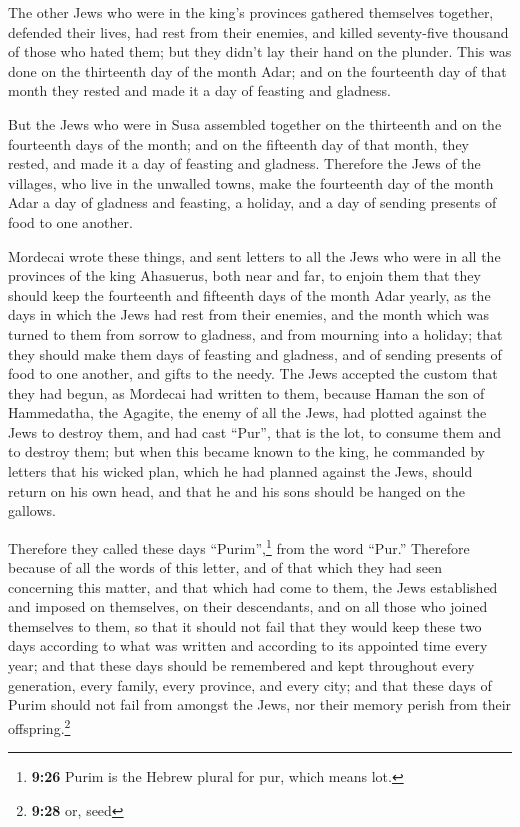  The other Jews who were in the king's provinces gathered
themselves together, defended their lives, had rest from their enemies,
and killed seventy-five thousand of those who hated them; but they
didn't lay their hand on the plunder.  This was done on
the thirteenth day of the month Adar; and on the fourteenth day of that
month they rested and made it a day of feasting and gladness.

 But the Jews who were in Susa assembled together on the
thirteenth and on the fourteenth days of the month; and on the fifteenth
day of that month, they rested, and made it a day of feasting and
gladness.  Therefore the Jews of the villages, who live
in the unwalled towns, make the fourteenth day of the month Adar a day
of gladness and feasting, a holiday, and a day of sending presents of
food to one another.

 Mordecai wrote these things, and sent letters to all the
Jews who were in all the provinces of the king Ahasuerus, both near and
far,  to enjoin them that they should keep the fourteenth
and fifteenth days of the month Adar yearly,  as the days
in which the Jews had rest from their enemies, and the month which was
turned to them from sorrow to gladness, and from mourning into a
holiday; that they should make them days of feasting and gladness, and
of sending presents of food to one another, and gifts to the needy.
 The Jews accepted the custom that they had begun, as
Mordecai had written to them,  because Haman the son of
Hammedatha, the Agagite, the enemy of all the Jews, had plotted against
the Jews to destroy them, and had cast ``Pur'', that is the lot, to
consume them and to destroy them;  but when this became
known to the king, he commanded by letters that his wicked plan, which
he had planned against the Jews, should return on his own head, and that
he and his sons should be hanged on the gallows.

 Therefore they called these days ``Purim'',\footnote{\textbf{9:26}
  Purim is the Hebrew plural for pur, which means lot.} from the word
``Pur.'' Therefore because of all the words of this letter, and of that
which they had seen concerning this matter, and that which had come to
them,  the Jews established and imposed on themselves, on
their descendants, and on all those who joined themselves to them, so
that it should not fail that they would keep these two days according to
what was written and according to its appointed time every year;
 and that these days should be remembered and kept
throughout every generation, every family, every province, and every
city; and that these days of Purim should not fail from amongst the
Jews, nor their memory perish from their offspring.\footnote{\textbf{9:28}
  or, seed}

